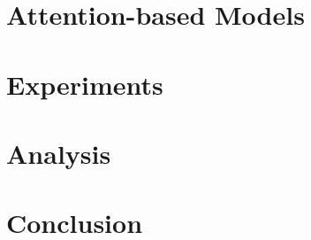 

%

\section{Attention-based Models}
\label{sec:attn}



\section{Experiments}
\label{sec:exp}



\section{Analysis}
\label{sec:analysis}


\section{Conclusion}
\label{sec:conclude}



